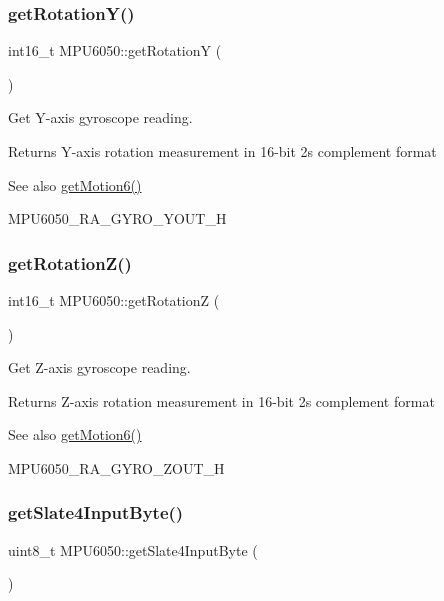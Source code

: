 \subsubsection{\texorpdfstring{getRotationY()}{getRotationY()}}
{\footnotesize\ttfamily int16\+\_\+t M\+P\+U6050\+::get\+RotationY (\begin{DoxyParamCaption}{ }\end{DoxyParamCaption})}

Get Y-\/axis gyroscope reading. \begin{DoxyReturn}{Returns}
Y-\/axis rotation measurement in 16-\/bit 2\textquotesingle{}s complement format 
\end{DoxyReturn}
\begin{DoxySeeAlso}{See also}
\mbox{\hyperlink{class_m_p_u6050_a574d3093dc131e4251a9b37adf208ca7}{get\+Motion6()}} 

M\+P\+U6050\+\_\+\+R\+A\+\_\+\+G\+Y\+R\+O\+\_\+\+Y\+O\+U\+T\+\_\+H 
\end{DoxySeeAlso}
\mbox{\label{class_m_p_u6050_ae0fee1ba996a2b6f914df6fc34e7da48}} 
\subsubsection{\texorpdfstring{getRotationZ()}{getRotationZ()}}
{\footnotesize\ttfamily int16\+\_\+t M\+P\+U6050\+::get\+RotationZ (\begin{DoxyParamCaption}{ }\end{DoxyParamCaption})}

Get Z-\/axis gyroscope reading. \begin{DoxyReturn}{Returns}
Z-\/axis rotation measurement in 16-\/bit 2\textquotesingle{}s complement format 
\end{DoxyReturn}
\begin{DoxySeeAlso}{See also}
\mbox{\hyperlink{class_m_p_u6050_a574d3093dc131e4251a9b37adf208ca7}{get\+Motion6()}} 

M\+P\+U6050\+\_\+\+R\+A\+\_\+\+G\+Y\+R\+O\+\_\+\+Z\+O\+U\+T\+\_\+H 
\end{DoxySeeAlso}
\mbox{\label{class_m_p_u6050_a9bc93f34bc3d85cbe6010b4a3a88c5a7}} 
\subsubsection{\texorpdfstring{getSlate4InputByte()}{getSlate4InputByte()}}
{\footnotesize\ttfamily uint8\+\_\+t M\+P\+U6050\+::get\+Slate4\+Input\+Byte (\begin{DoxyParamCaption}{ }\end{DoxyParamCaption})}

